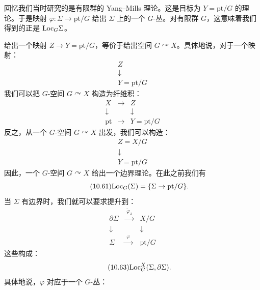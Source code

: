 回忆我们当时研究的是有限群的 Yang--Mills 理论。这是目标为 $Y=\mathrm{pt}/G$ 的理论。于是映射 $\varphi\colon\Sigma\to\mathrm{pt}/G$ 给出 $\Sigma$ 上的一个 $G$-丛。对有限群 $G$，这意味着我们得到的正是 $\mathrm{Loc}_G\Sigma$。

给出一个映射 $Z\to Y=\mathrm{pt}/G$，等价于给出空间 $G\curvearrowright X$。具体地说，对于一个映射：
\begin{equation}\tag{10.58}
\begin{array}{c}
Z\\[-2pt]
\downarrow\\[-2pt]
Y=\mathrm{pt}/G
\end{array}
\end{equation}
我们可以把 $G$-空间 $G\curvearrowright X$ 构造为纤维积：
\begin{equation}\tag{10.59}
\begin{array}{ccc}
X & \longrightarrow & Z\\[4pt]
\downarrow & & \downarrow\\[4pt]
\mathrm{pt} & \longrightarrow & Y=\mathrm{pt}/G
\end{array}
\end{equation}
反之，从一个 $G$-空间 $G\curvearrowright X$ 出发，我们可以构造：
\begin{equation}\tag{10.60}
\begin{array}{c}
Z=X/G\\[-2pt]
\downarrow\\[-2pt]
Y=\mathrm{pt}/G
\end{array}
\end{equation}
因此，一个 $G$-空间 $G\curvearrowright X$ 给出一个边界理论。在此之前我们有
\begin{equation}\tag{10.61}
\mathrm{Loc}_G(\Sigma)=\{\Sigma\to\mathrm{pt}/G\}.
\end{equation}
当 $\Sigma$ 有边界时，我们就可以要求提升到：
\begin{equation}\tag{10.62}
\begin{array}{ccc}
\partial\Sigma & \xrightarrow{\ \ \widetilde{\varphi}_{\partial}\ \ } & X/G\\[4pt]
\downarrow & & \downarrow\\[4pt]
\Sigma & \xrightarrow{\ \ \varphi\ \ } & \mathrm{pt}/G
\end{array}
\end{equation}
这些构成：
\begin{equation}\tag{10.63}
\mathrm{Loc}_G^{X}(\Sigma,\partial\Sigma).
\end{equation}
具体地说，$\varphi$ 对应于一个 $G$-丛：
